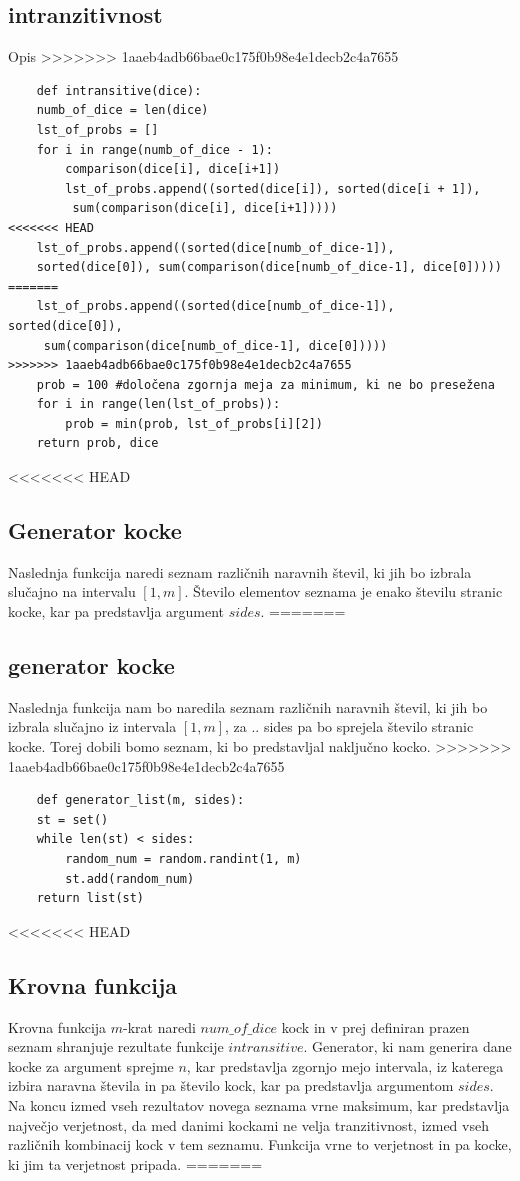 \documentclass[12pt,a4paper]{amsart}
\begin{document}
 \subsection{intranzitivnost}
 Opis
>>>>>>> 1aaeb4adb66bae0c175f0b98e4e1decb2c4a7655
 \begin{verbatim}
    def intransitive(dice):
    numb_of_dice = len(dice)
    lst_of_probs = []
    for i in range(numb_of_dice - 1):
        comparison(dice[i], dice[i+1])
        lst_of_probs.append((sorted(dice[i]), sorted(dice[i + 1]),
         sum(comparison(dice[i], dice[i+1]))))
<<<<<<< HEAD
    lst_of_probs.append((sorted(dice[numb_of_dice-1]), 
    sorted(dice[0]), sum(comparison(dice[numb_of_dice-1], dice[0]))))
=======
    lst_of_probs.append((sorted(dice[numb_of_dice-1]), sorted(dice[0]),
     sum(comparison(dice[numb_of_dice-1], dice[0]))))
>>>>>>> 1aaeb4adb66bae0c175f0b98e4e1decb2c4a7655
    prob = 100 #določena zgornja meja za minimum, ki ne bo presežena
    for i in range(len(lst_of_probs)):
        prob = min(prob, lst_of_probs[i][2])
    return prob, dice
 \end{verbatim}

<<<<<<< HEAD
 \subsection{Generator kocke}
 Naslednja funkcija naredi seznam različnih naravnih števil, ki jih bo izbrala slučajno na intervalu $\left[1,m\right]$. 
 Število elementov seznama je enako številu stranic kocke, kar pa predstavlja argument $sides$.
=======
 \subsection{generator kocke}
 Naslednja funkcija nam bo naredila seznam različnih naravnih števil, ki jih bo izbrala slučajno iz intervala $\left[1,m\right]$, za .. sides pa bo sprejela število stranic kocke. Torej dobili bomo seznam, ki bo predstavljal naključno kocko.
>>>>>>> 1aaeb4adb66bae0c175f0b98e4e1decb2c4a7655
 \begin{verbatim}
    def generator_list(m, sides):
    st = set()
    while len(st) < sides:
        random_num = random.randint(1, m)
        st.add(random_num)
    return list(st)
 \end{verbatim}

<<<<<<< HEAD
 \subsection{Krovna funkcija}
 Krovna funkcija $m$-krat naredi $num\_of\_dice$ kock in v prej definiran prazen seznam shranjuje rezultate funkcije $intransitive$. 
 Generator, ki nam generira dane kocke za argument sprejme $n$, kar predstavlja zgornjo mejo intervala, iz katerega izbira naravna števila in pa število kock, kar pa predstavlja argumentom $sides$.
 Na koncu izmed vseh rezultatov novega seznama vrne maksimum, kar predstavlja največjo verjetnost, da med danimi kockami ne velja tranzitivnost, izmed vseh različnih kombinacij kock v tem seznamu.
 Funkcija vrne to verjetnost in pa kocke, ki jim ta verjetnost pripada.
=======
\end{document}
